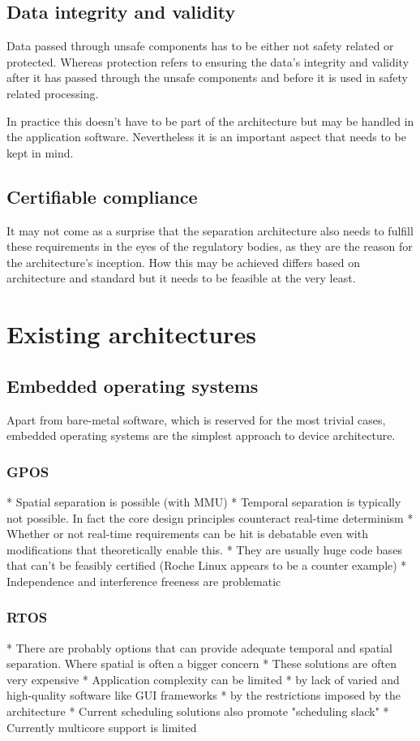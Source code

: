 \subsection{Data integrity and validity}
Data passed through unsafe components has to be either not safety related or protected. Whereas protection refers to ensuring the data's integrity and validity after it has passed through the unsafe components and before it is used in safety related processing.

In practice this doesn't have to be part of the architecture but may be handled in the application software. Nevertheless it is an important aspect that needs to be kept in mind.
\subsection{Certifiable compliance}
It may not come as a surprise that the separation architecture also needs to fulfill these requirements in the eyes of the regulatory bodies, as they are the reason for the architecture's inception.
How this may be achieved differs based on architecture and standard but it needs to be feasible at the very least.


\section{Existing architectures}
\subsection{Embedded operating systems}
Apart from bare-metal software, which is reserved for the most trivial cases,  embedded operating systems are the simplest approach to device architecture. 
\subsubsection{GPOS}
* Spatial separation is possible (with MMU)
* Temporal separation is typically not possible. In fact the core design principles counteract real-time determinism
* Whether or not real-time requirements can be hit is debatable even with modifications that theoretically enable this.
* They are usually huge code bases that can't be feasibly certified (Roche Linux appears to be a counter example)
* Independence and interference freeness are problematic
\subsubsection{RTOS}
* There are probably options that can provide adequate temporal and spatial separation. Where spatial is often a bigger concern
* These solutions are often very expensive 
* Application complexity can be limited
	* by lack of varied and high-quality software like GUI frameworks
    * by the restrictions imposed by the architecture
 * Current scheduling solutions also promote "scheduling slack"
 * Currently multicore support is limited
